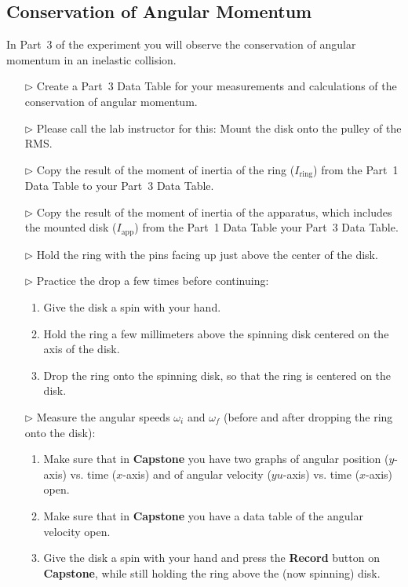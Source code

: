 \subsection{Conservation of Angular Momentum}
In Part~3 of the experiment you will observe the conservation of angular momentum in an inelastic collision. 
\begin{itemize}
\item[$\triangleright$] Create a Part~3 Data Table for your measurements and calculations of the conservation of angular momentum.
\item[$\triangleright$] Please call the lab instructor for this: Mount the disk onto the pulley of the RMS.
\item[$\triangleright$] Copy the result of the moment of inertia of the ring ($I_{\mbox{ring}}$) from the Part~1 Data Table to your Part~3 Data Table.
\item[$\triangleright$] Copy the result of the moment of inertia of the apparatus, which includes the mounted disk ($I_{\mbox{app}}$) from the Part~1 Data Table your Part~3 Data Table.
\item[$\triangleright$] Hold the ring with the pins facing up just above the center of the disk.
\item[$\triangleright$] Practice the drop a few times before continuing:
  \begin{enumerate}
  \item Give the disk a spin with your hand.
  \item Hold the ring a few millimeters above the spinning disk centered on the axis of the disk. 
  \item Drop the ring onto the spinning disk, so that the ring is centered on the disk.
  \end{enumerate}
\item[$\triangleright$] Measure the angular speeds $\omega_{i}$ and $\omega_{f}$ (before and after dropping the ring onto the disk):
  \begin{enumerate}
  \item Make sure that in \textbf{Capstone} you have two graphs of angular position ($y$-axis) vs. time ($x$-axis) and of angular velocity ($yu$-axis) vs. time ($x$-axis) open.
  \item Make sure that in \textbf{Capstone} you have a data table of the angular velocity open.
  \item Give the disk a spin with your hand and press the \textbf{Record} button on \textbf{Capstone}, while still holding the ring above the (now spinning) disk.

\end{enumerate}
\end{itemize}

